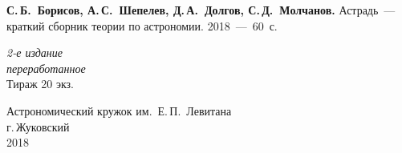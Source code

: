 \setcounter{page}{1}
\thispagestyle{empty}
\vspace*{1cm}
{\hspace{1pc} {\bfseries С.\,Б.~Борисов, А.\,С.~Шепелев, Д.\,А.~Долгов, С.\,Д.~Молчанов.} Астрадь~--- краткий сборник теории по астрономии. 2018~---~60~с.} 
\vskip3cm
\begin{center}
	{\slshape 2-е издание\\
	переработанное}\\[5mm]
	\small  Тираж 20 экз.
\end{center}
\vskip5cm
\begin{center}
Астрономический кружок им.~Е.\,П.~Левитана\\[3mm]
г.\,Жуковский\\[1cm]
	2018
\end{center}
\newpage
